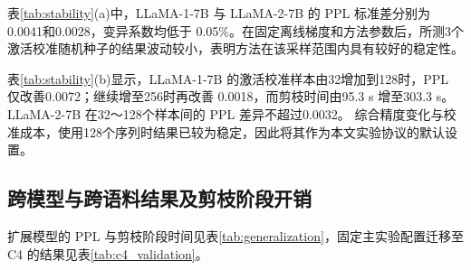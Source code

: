 \documentclass[UTF8,fontset=fandol]{ctexart}
\begin{document}
表\ref{tab:stability}(a)中，LLaMA-1-7B 与 LLaMA-2-7B 的 PPL 标准差分别为0.0041和0.0028，变异系数均低于
0.05\%。在固定离线梯度和方法参数后，所测3个激活校准随机种子的结果波动较小，表明方法在该采样范围内具有较好的稳定性。

表\ref{tab:stability}(b)显示，LLaMA-1-7B 的激活校准样本由32增加到128时，PPL 仅改善0.0072；继续增至256时再改善
0.0018，而剪枝时间由95.3 s 增至303.3 s。LLaMA-2-7B 在32～128个样本间的 PPL 差异不超过0.0032。
综合精度变化与校准成本，使用128个序列时结果已较为稳定，因此将其作为本文实验协议的默认设置。

\FloatBarrier
\subsection{跨模型与跨语料结果及剪枝阶段开销}

扩展模型的 PPL 与剪枝阶段时间见表\ref{tab:generalization}，固定主实验配置迁移至 C4 的结果见表\ref{tab:c4_validation}。
\end{document}
